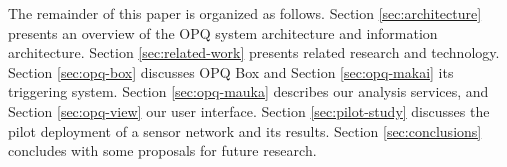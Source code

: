 The remainder of this paper is organized as follows. Section \ref{sec:architecture} presents an overview of the OPQ system architecture and information architecture. Section \ref{sec:related-work} presents related research and technology.  Section \ref{sec:opq-box} discusses OPQ Box and Section \ref{sec:opq-makai} its triggering system. Section \ref{sec:opq-mauka} describes our analysis services, and Section \ref{sec:opq-view} our user interface.  Section \ref{sec:pilot-study} discusses the pilot deployment of a sensor network and its results. Section \ref{sec:conclusions} concludes with some proposals for future research.


